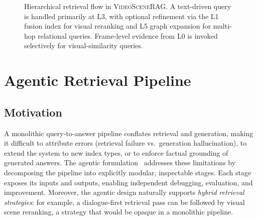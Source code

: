 \documentclass[11pt]{article}
\newcommand{\system}{\textsc{VideoSceneRAG}}
\begin{document}
\begin{figure}[!htb]
\centering
{}
\caption{Hierarchical retrieval flow in \system.  A text-driven query is
handled primarily at L3, with optional refinement via the L1 fusion index for
visual reranking and L5 graph expansion for multi-hop relational queries.
Frame-level evidence from L0 is invoked selectively for visual-similarity
queries.}
\label{fig:hierarchical_index}
\end{figure}

\section{Agentic Retrieval Pipeline}
\label{sec:agent}

\subsection{Motivation}

A monolithic query-to-answer pipeline conflates retrieval and generation,
making it difficult to attribute errors (retrieval failure vs.\ generation
hallucination), to extend the system to new index types, or to enforce factual
grounding of generated answers.  The agentic formulation~\cite{react,toolformer}
addresses these limitations by decomposing the pipeline into explicitly
modular, inspectable stages.  Each stage exposes its inputs and outputs,
enabling independent debugging, evaluation, and improvement.  Moreover, the
agentic design naturally supports \emph{hybrid retrieval strategies}: for
example, a dialogue-first retrieval pass can be followed by visual scene
reranking, a strategy that would be opaque in a monolithic pipeline.
\end{document}
